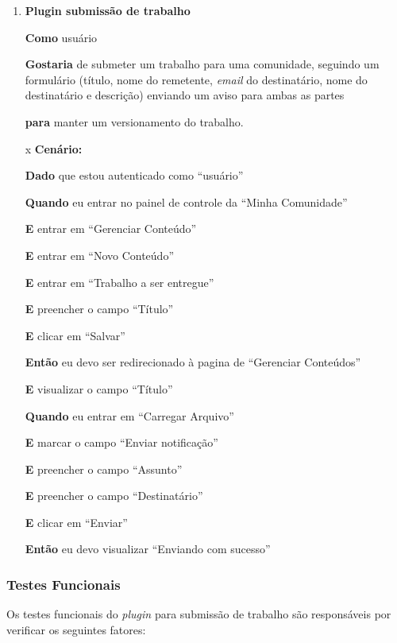 \begin{enumerate}
\item  \textbf{Plugin submissão de trabalho}

\textbf{Como} usuário

\textbf{Gostaria} de submeter um trabalho para uma comunidade, seguindo um formulário (título, nome do remetente, \textit{email} do destinatário, nome do destinatário e descrição) enviando um aviso para ambas as partes

\textbf{para} manter um versionamento do trabalho.

x
\textbf{Cenário:}

\textbf{Dado} que estou autenticado como ``usuário''

\textbf{Quando} eu entrar no painel de controle da ``Minha Comunidade''

\textbf{E} entrar em ``Gerenciar Conteúdo''

\textbf{E} entrar em ``Novo Conteúdo''

\textbf{E} entrar em ``Trabalho a ser entregue''

\textbf{E} preencher o campo ``Título''

\textbf{E} clicar em ``Salvar''

\textbf{Então} eu devo ser redirecionado à pagina de ``Gerenciar Conteúdos''

\textbf{E} visualizar o campo ``Título''

\textbf{Quando} eu entrar em ``Carregar Arquivo''

\textbf{E} marcar o campo ``Enviar notificação''

\textbf{E} preencher o campo ``Assunto''

\textbf{E} preencher o campo ``Destinatário''

\textbf{E} clicar em ``Enviar''

\textbf{Então} eu devo visualizar ``Enviando com sucesso''

\end{enumerate}

\subsubsection{Testes Funcionais}

Os testes funcionais do \textit{plugin} para submissão de trabalho são responsáveis por verificar os seguintes fatores:

